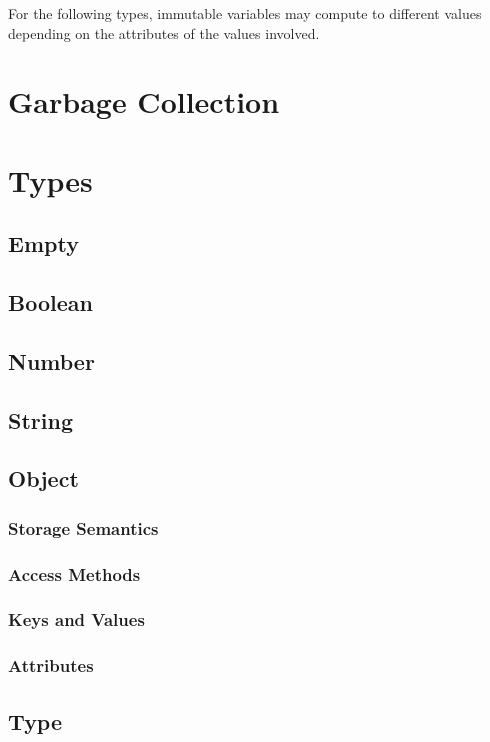 \documentclass[12pt,letterpaper]{report}
\begin{document}
For the following types, immutable variables may compute to different values depending on the attributes of the values involved.




\section{Garbage Collection}
\section{Types}
\subsection{Empty}
\subsection{Boolean}
\subsection{Number}
\subsection{String}
\subsection{Object}
\subsubsection{Storage Semantics}
\subsubsection{Access Methods}
\subsubsection{Keys and Values}    
\subsubsection{Attributes}
\subsection{Type}            
\end{document}
